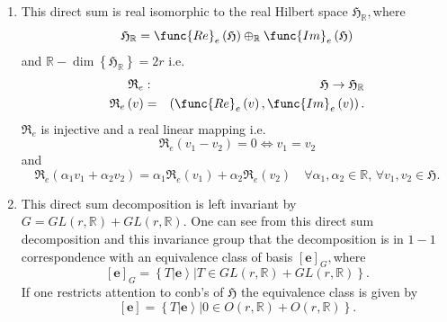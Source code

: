 \documentclass[aps,preprint]{revtex4}
\begin{document}
\begin{enumerate}
\item This direct sum is real isomorphic to the real Hilbert space $%
\mathfrak{H}_{\mathbb{R}},$where 
\begin{equation}
\mathfrak{H}_{\mathbb{R}}=\func{Re}_{e}\left( \mathfrak{H}\right) \oplus _{%
\mathbb{R}}\func{Im}_{e}\left( \mathfrak{H}\right)
\end{equation}%
and $\mathbb{R-}\dim \left\{ \mathfrak{H}_{\mathbb{R}}\right\} =2r$ i.e. 
\begin{eqnarray}
\mathfrak{R}_{e} &:&\mathfrak{H\rightarrow H}_{\mathbb{R}} \\
\mathfrak{R}_{e}\left( v\right) &=&\left( \func{Re}_{e}\left( v\right) ,%
\func{Im}_{e}\left( v\right) \right) .
\end{eqnarray}%
$\mathfrak{R}_{e}$ is injective and a real linear mapping i.e. 
\begin{equation}
\mathfrak{R}_{e}\left( v_{1}-v_{2}\right) =0\Leftrightarrow v_{1}=v_{2}
\end{equation}%
and 
\begin{equation}
\mathfrak{R}_{e}\left( \alpha _{1}v_{1}+\alpha _{2}v_{2}\right) =\alpha _{1}%
\mathfrak{R}_{e}\left( v_{1}\right) +\alpha _{2}\mathfrak{R}_{e}\left(
v_{2}\right) \quad \forall \alpha _{1},\alpha _{2}\in \mathbb{R},\,\forall
v_{1},v_{2}\in \mathfrak{H}.
\end{equation}

\item This direct sum decomposition is left invariant by $G=GL\left( r,%
\mathbb{R}\right) +GL\left( r,\mathbb{R}\right) .$ One can see from this
direct sum decomposition and this invariance group that the decomposition is
in $1-1$ correspondence with an equivalence class of basis $\left[ \mathbf{e}%
\right] _{G},$where 
\begin{equation}
\left[ \mathbf{e}\right] _{G}=\left\{ \left. T\left\vert \mathbf{e}%
\right\rangle \right\vert T\in GL\left( r,\mathbb{R}\right) +GL\left( r,%
\mathbb{R}\right) \right\} .
\end{equation}%
If one restricts attention to conb's of $\mathfrak{H}$ the equivalence class
is given by 
\begin{equation}
\left[ \mathbf{e}\right] =\left\{ \left. T\left\vert \mathbf{e}\right\rangle
\right\vert 0\in O\left( r,\mathbb{R}\right) +O\left( r,\mathbb{R}\right)
\right\} .
\end{equation}


\end{enumerate}
\end{document}
